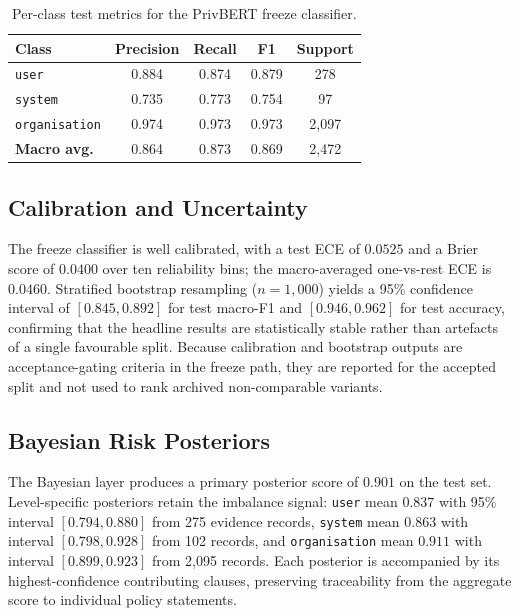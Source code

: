 \documentclass[conference]{IEEEtran}
\begin{document}
\begin{table}[t]
\centering
\caption{Per-class test metrics for the PrivBERT freeze classifier.}
\label{tab:perclass}
\footnotesize
\begin{tabular}{@{}l cccc@{}}
\toprule
\textbf{Class} & \textbf{Precision} & \textbf{Recall} & \textbf{F1} & \textbf{Support} \\
\midrule
\texttt{user}         & 0.884 & 0.874 & 0.879 & 278 \\
\texttt{system}       & 0.735 & 0.773 & 0.754 & 97 \\
\texttt{organisation} & 0.974 & 0.973 & 0.973 & 2{,}097 \\
\midrule
\textbf{Macro avg.}   & 0.864 & 0.873 & 0.869 & 2{,}472 \\
\bottomrule
\end{tabular}
\end{table}

\subsection{Calibration and Uncertainty}
The freeze classifier is well calibrated, with a test ECE of $0.0525$ and a
Brier score of $0.0400$ over ten reliability bins; the macro-averaged
one-vs-rest ECE is $0.0460$.
Stratified bootstrap resampling ($n = 1{,}000$) yields a 95\% confidence
interval of $[0.845, 0.892]$ for test macro-F1 and $[0.946, 0.962]$ for test
accuracy, confirming that the headline results are statistically stable
rather than artefacts of a single favourable split. Because calibration and
bootstrap outputs are acceptance-gating criteria in the freeze path, they are
reported for the accepted split and not used to rank archived
non-comparable variants.

\subsection{Bayesian Risk Posteriors}
The Bayesian layer produces a primary posterior score of $0.901$ on the test
set. Level-specific posteriors retain the imbalance signal: \texttt{user}
mean $0.837$ with 95\% interval $[0.794, 0.880]$ from 275 evidence records,
\texttt{system} mean $0.863$ with interval $[0.798, 0.928]$ from 102 records,
and \texttt{organisation} mean $0.911$ with interval $[0.899, 0.923]$ from
2{,}095 records. Each posterior is accompanied by its highest-confidence
contributing clauses, preserving traceability from the aggregate score to
individual policy statements.
\end{document}
